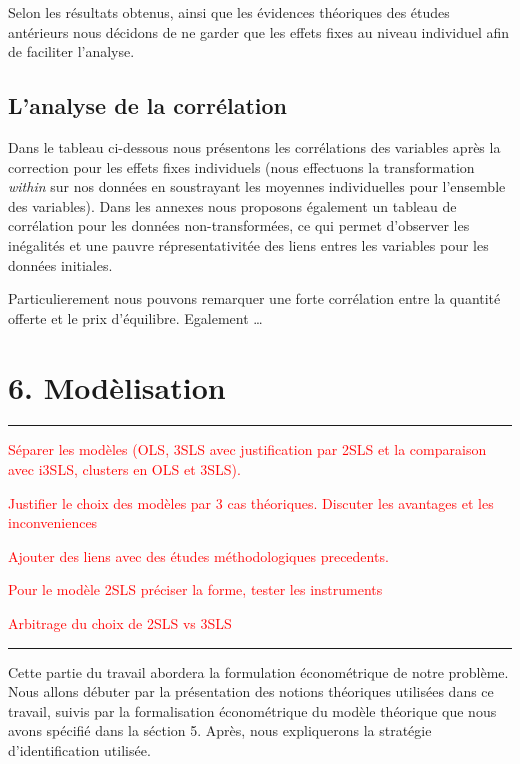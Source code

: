 \documentclass[11pt,]{article}
\begin{document}
\FloatBarrier

Selon les résultats obtenus, ainsi que les évidences théoriques des
études antérieurs nous décidons de ne garder que les effets fixes au
niveau individuel afin de faciliter l'analyse.

\hypertarget{lanalyse-de-la-correlation}{%
\subsection{L'analyse de la
corrélation}\label{lanalyse-de-la-correlation}}

Dans le tableau ci-dessous nous présentons les corrélations des
variables après la correction pour les effets fixes individuels (nous
effectuons la transformation \emph{within} sur nos données en
soustrayant les moyennes individuelles pour l'ensemble des variables).
Dans les annexes nous proposons également un tableau de corrélation pour
les données non-transformées, ce qui permet d'observer les inégalités et
une pauvre répresentativitée des liens entres les variables pour les
données initiales.

Particulierement nous pouvons remarquer une forte corrélation entre la
quantité offerte et le prix d'équilibre. Egalement \ldots{}

\hypertarget{modelisation}{%
\section{6. Modèlisation}\label{modelisation}}

\noindent

\rule[0.5ex]{\linewidth}{1pt}

\textcolor{red}{Séparer les modèles (OLS, 3SLS avec justification par 2SLS et la comparaison avec i3SLS, clusters en OLS et 3SLS).}

\textcolor{red}{Justifier le choix des modèles par 3 cas théoriques. Discuter les avantages et les inconveniences}

\textcolor{red}{Ajouter des liens avec des études méthodologiques precedents.}

\textcolor{red}{Pour le modèle 2SLS préciser la forme, tester les instruments}

\textcolor{red}{Arbitrage du choix de 2SLS vs 3SLS}

\noindent

\rule[0.5ex]{\linewidth}{1pt}

Cette partie du travail abordera la formulation économétrique de notre
problème. Nous allons débuter par la présentation des notions théoriques
utilisées dans ce travail, suivis par la formalisation économétrique du
modèle théorique que nous avons spécifié dans la séction 5. Après, nous
expliquerons la stratégie d'identification utilisée.
\end{document}
